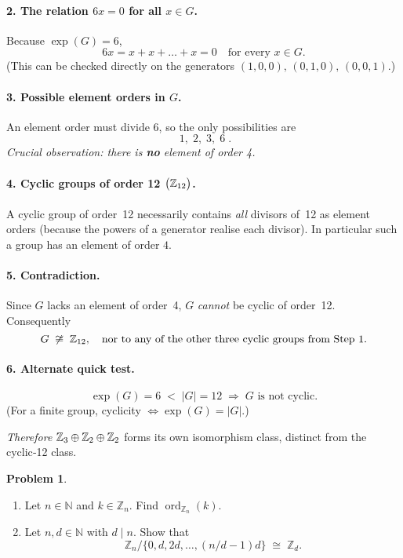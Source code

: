 \documentclass[12pt]{article}
\theoremstyle{definition} %
\newtheorem{problem}{Problem}
\theoremstyle{plain} %
\begin{document}
\paragraph{2.\;  The relation \(6x=0\) for all \(x\in G\).}
Because \(\exp(G)=6\),
\[
   6x = x+x+\dots+x = 0
   \quad\text{for every }x\in G.
\]
(This can be checked directly on the generators
\((1,0,0),\,(0,1,0),\,(0,0,1)\).)

\paragraph{3.\;  Possible element orders in \(G\).}
An element order must divide \(6\), so the only possibilities are
\[
  \boxed{\;1,\;2,\;3,\;6\;}.
\]
\emph{Crucial observation: there is \textbf{no} element of order 4.}

\paragraph{4.\;  Cyclic groups of order 12 \(\bigl(\Bbb Z_{12}\bigr)\).}
A cyclic group of order~12 necessarily contains \emph{all} divisors of~12
as element orders (because the powers of a generator realise each
divisor).  
In particular such a group has an element of order \(4\).

\paragraph{5.\;  Contradiction.}
Since \(G\) lacks an element of order~4,
\(G\) \emph{cannot} be cyclic of order 12.
Consequently
\[
  G\;\not\cong\;\Bbb Z_{12},
  \quad
  \text{nor to any of the other three cyclic groups from Step 1.}
\]

\paragraph{6.\;  Alternate quick test.}
\[
   \exp(G)=6 \;<\; \lvert G\rvert=12
   \;\Longrightarrow\;
   G\text{ is not cyclic.}
\]
(For a finite group, cyclicity \(\Leftrightarrow\exp(G)=\lvert G\rvert\).)

\bigskip
\noindent
\emph{Therefore} \(
  \Bbb Z_3\oplus\Bbb Z_2\oplus\Bbb Z_2
\) forms its own isomorphism class, distinct from the cyclic‑12 class.
\begin{problem}
  \begin{enumerate}[label=\textbf{(\alph*)}]
    \item Let $n\in\mathbb{N}$ and $k\in\mathbb{Z}_n$.  Find $\operatorname{ord}_{\mathbb{Z}_n}(k)$.
    \item Let $n,d\in\mathbb{N}$ with $d\mid n$.  Show that
          \[
            \mathbb{Z}_n\big/\{0,d,2d,\dots,(n/d-1)d\}\;\cong\;\mathbb{Z}_d .
          \]
  \end{enumerate}
\end{problem}
\end{document}
